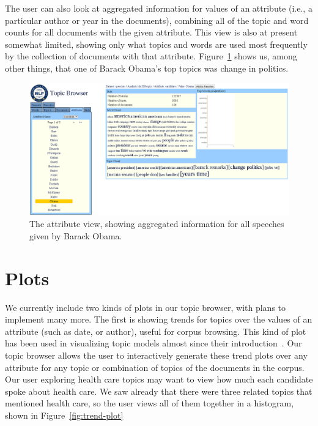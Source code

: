 \documentclass{article}
\begin{document}
The user can also look at aggregated information for values of an attribute
(i.e., a particular author or year in the documents), combining all of the
topic and word counts for all documents with the given attribute.  This view is
also at present somewhat limited, showing only what topics and words are used
most frequently by the collection of documents with that attribute.
Figure~\ref{fig:attribute} shows us, among other things, that one of Barack
Obama's top topics was change in politics.

\begin{figure}
  \centering
  \includegraphics[width=\textwidth]{attribute}
  \caption{The attribute view, showing aggregated information for all speeches
  given by Barack Obama.}
  \label{fig:attribute}
\end{figure}

\section{Plots}

We currently include two kinds of plots in our topic browser, with plans to
implement many more.  The first is showing trends for topics over the values of
an attribute (such as date, or author), useful for corpus browsing.  This kind
of plot has been used in visualizing topic models almost since their
introduction~\cite{griffiths-2004-finding-scientific-topics}.  Our topic
browser allows the user to interactively generate these trend plots over any
attribute for any topic or combination of topics of the documents in the
corpus.  Our user exploring health care topics may want to view how much each
candidate spoke about health care.  We saw already that there were three
related topics that mentioned health care, so the user views all of them
together in a histogram, shown in Figure~\ref{fig:trend-plot}
\end{document}
